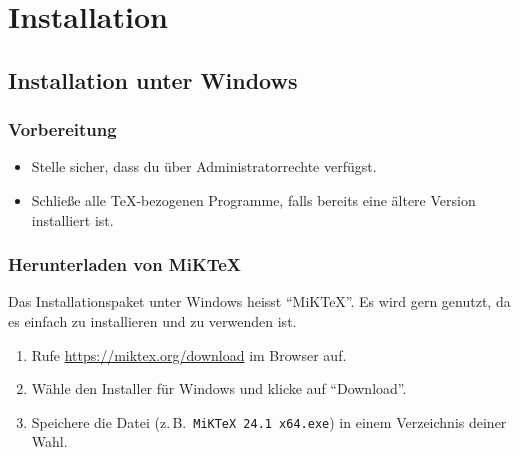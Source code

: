 \chapter{Installation}

\section{Installation unter Windows}
\subsection{Vorbereitung}
\begin{itemize}
    \item Stelle sicher, dass du über Administratorrechte verfügst.
    \item Schließe alle \TeX-bezogenen Programme, falls bereits eine ältere Version installiert ist.
\end{itemize}

\subsection{Herunterladen von MiK\TeX}
Das Installationspaket unter Windows heisst \enquote{MiK\TeX}. Es wird gern genutzt, da es einfach zu installieren und zu verwenden ist.
\begin{enumerate}
    \item Rufe \mbox{\url{https://miktex.org/download}} im Browser auf.
    \item Wähle den Installer für Windows und klicke auf \enquote{Download}.
    \item Speichere die Datei (z.\,B.\ \texttt{MiKTeX 24.1 x64.exe}) in einem Verzeichnis deiner Wahl.
\end{enumerate}

